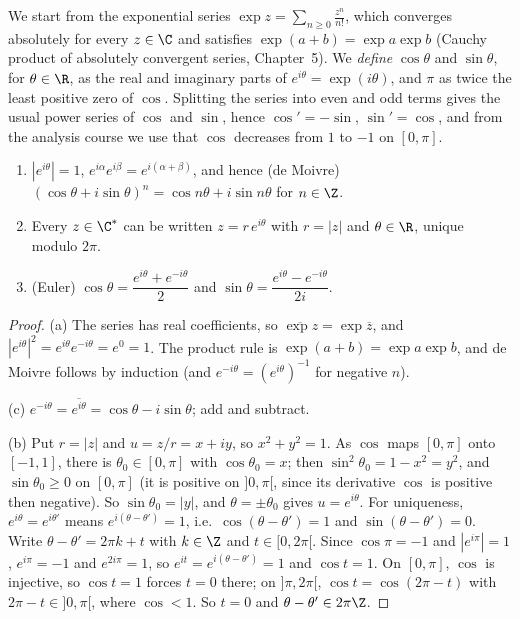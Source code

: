We start from the exponential series $\exp z=\sum_{n\ge0}\frac{z^n}{n!}$, which converges absolutely for every $z\in\C$ and satisfies $\exp(a+b)=\exp a\exp b$ (Cauchy product of absolutely convergent series, Chapter~5). We \emph{define} $\cos\theta$ and $\sin\theta$, for $\theta\in\R$, as the real and imaginary parts of $e^{i\theta}=\exp(i\theta)$, and $\pi$ as twice the least positive zero of $\cos$. Splitting the series into even and odd terms gives the usual power series of $\cos$ and $\sin$, hence $\cos'=-\sin$, $\sin'=\cos$, and from the analysis course we use that $\cos$ decreases from $1$ to $-1$ on $[0,\pi]$.

\begin{proposition}\label{prop:expform}
\begin{enumerate}[label=(\alph*)]
\item $|e^{i\theta}|=1$, $e^{i\alpha}e^{i\beta}=e^{i(\alpha+\beta)}$, and hence (de Moivre) $(\cos\theta+i\sin\theta)^n=\cos n\theta+i\sin n\theta$ for $n\in\Z$.
\item Every $z\in\C^*$ can be written $z=r\,e^{i\theta}$ with $r=|z|$ and $\theta\in\R$, unique modulo $2\pi$.
\item (Euler) $\cos\theta=\dfrac{e^{i\theta}+e^{-i\theta}}2$ and $\sin\theta=\dfrac{e^{i\theta}-e^{-i\theta}}{2i}$.
\end{enumerate}
\end{proposition}
\begin{proof}
(a) The series has real coefficients, so $\overline{\exp z}=\exp\overline z$, and $|e^{i\theta}|^2=e^{i\theta}e^{-i\theta}=e^0=1$. The product rule is $\exp(a+b)=\exp a\exp b$, and de Moivre follows by induction (and $e^{-i\theta}=(e^{i\theta})^{-1}$ for negative $n$).

(c) $e^{-i\theta}=\overline{e^{i\theta}}=\cos\theta-i\sin\theta$; add and subtract.

(b) Put $r=|z|$ and $u=z/r=x+iy$, so $x^2+y^2=1$. As $\cos$ maps $[0,\pi]$ onto $[-1,1]$, there is $\theta_0\in[0,\pi]$ with $\cos\theta_0=x$; then $\sin^2\theta_0=1-x^2=y^2$, and $\sin\theta_0\ge0$ on $[0,\pi]$ (it is positive on $]0,\pi[$, since its derivative $\cos$ is positive then negative). So $\sin\theta_0=|y|$, and $\theta=\pm\theta_0$ gives $u=e^{i\theta}$. For uniqueness, $e^{i\theta}=e^{i\theta'}$ means $e^{i(\theta-\theta')}=1$, i.e.\ $\cos(\theta-\theta')=1$ and $\sin(\theta-\theta')=0$. Write $\theta-\theta'=2\pi k+t$ with $k\in\Z$ and $t\in[0,2\pi[$. Since $\cos\pi=-1$ and $|e^{i\pi}|=1$, $e^{i\pi}=-1$ and $e^{2i\pi}=1$, so $e^{it}=e^{i(\theta-\theta')}=1$ and $\cos t=1$. On $[0,\pi]$, $\cos$ is injective, so $\cos t=1$ forces $t=0$ there; on $]\pi,2\pi[$, $\cos t=\cos(2\pi-t)$ with $2\pi-t\in]0,\pi[$, where $\cos<1$. So $t=0$ and $\theta-\theta'\in2\pi\Z$.
\end{proof}

